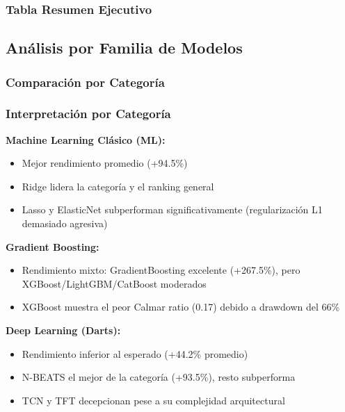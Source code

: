 \subsubsection{Tabla Resumen Ejecutivo}



\subsection{An\'alisis por Familia de Modelos}
\label{subsec:family_analysis}

\subsubsection{Comparaci\'on por Categor\'ia}



\subsubsection{Interpretaci\'on por Categor\'ia}

\textbf{Machine Learning Cl\'asico (ML):}
\begin{itemize}
    \item Mejor rendimiento promedio (+94.5\%)
    \item Ridge lidera la categor\'ia y el ranking general
    \item Lasso y ElasticNet subperforman significativamente (regularizaci\'on L1 demasiado agresiva)
\end{itemize}

\textbf{Gradient Boosting:}
\begin{itemize}
    \item Rendimiento mixto: GradientBoosting excelente (+267.5\%), pero XGBoost/LightGBM/CatBoost moderados
    \item XGBoost muestra el peor Calmar ratio (0.17) debido a drawdown del 66\%
\end{itemize}

\textbf{Deep Learning (Darts):}
\begin{itemize}
    \item Rendimiento inferior al esperado (+44.2\% promedio)
    \item N-BEATS el mejor de la categor\'ia (+93.5\%), resto subperforma
    \item TCN y TFT decepcionan pese a su complejidad arquitectural
\end{itemize}

